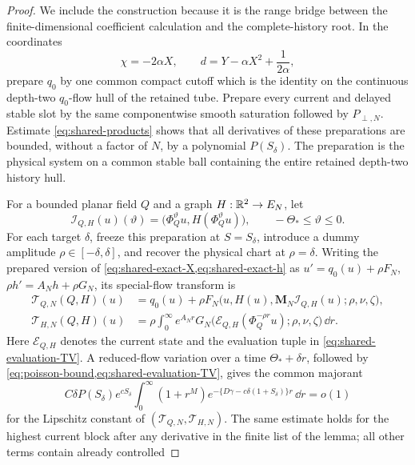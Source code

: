 \begin{proof}
We include the construction because it is the range bridge between the
finite-dimensional coefficient calculation and the complete-history root.
In the coordinates
\[
 \chi=-2\alpha X,
 \qquad d=Y-\alpha X^2+\frac1{2\alpha},
\]
prepare \(q_0\) by one common compact cutoff which is the identity on the
continuous depth-two \(q_0\)-flow hull of the retained tube.  Prepare every
current and delayed stable slot by the same componentwise smooth saturation
followed by \(P_{\perp,N}\).  Estimate \cref{eq:shared-products} shows that
all derivatives of these preparations are bounded, without a factor of
\(N\), by a polynomial \(P(S_\delta)\).  The preparation is the physical
system on a common stable ball containing the entire retained depth-two
history hull.

For a bounded planar field \(Q\) and a graph \(H:\mathbb R^2\to E_N\), let
\[
 \mathcal I_{Q,H}(u)(\vartheta)
 =\bigl(\Phi_Q^\vartheta u,H(\Phi_Q^\vartheta u)\bigr),
 \qquad -\Theta_*\le\vartheta\le0.
\]
For each target \(\delta\), freeze this preparation at
\(S=S_\delta\), introduce a dummy amplitude
\(\rho\in[-\delta,\delta]\), and recover the physical chart at
\(\rho=\delta\).  Writing the prepared version of
\cref{eq:shared-exact-X,eq:shared-exact-h} as
\(u'=q_0(u)+\rho F_N\),
\(\rho h'=A_Nh+\rho G_N\), its special-flow transform is
\begin{align}
 \mathcal T_{Q,N}(Q,H)(u)
 &=q_0(u)+\rho F_N
   \bigl(u,H(u),\mathbf M_N\mathcal I_{Q,H}(u);\rho,\nu,\zeta\bigr),
                                                               \label{eq:shared-TQ}\\
 \mathcal T_{H,N}(Q,H)(u)
 &=\rho\int_0^\infty e^{A_Nr}G_N
   \bigl(\mathcal E_{Q,H}(\Phi_Q^{-\rho r}u);
               \rho,\nu,\zeta\bigr)\,\dd r.          \label{eq:shared-TH}
\end{align}
Here \(\mathcal E_{Q,H}\) denotes the current state and the evaluation
tuple in \cref{eq:shared-evaluation-TV}.  A reduced-flow variation over a
time \(\Theta_*+\delta r\), followed by
\cref{eq:poisson-bound,eq:shared-evaluation-TV}, gives the common
majorant
\begin{equation}
 C\delta P(S_\delta)e^{cS_\delta}
 \int_0^\infty(1+r^M)
 e^{-\{D\gamma-c\delta(1+S_\delta)\}r}\,\dd r=o(1)   \label{eq:shared-graph-contraction}
\end{equation}
for the Lipschitz constant of \((\mathcal T_{Q,N},\mathcal T_{H,N})\).
The same estimate holds for the highest current block after any derivative
in the finite list of the lemma; all other terms contain already controlled

\end{proof}
